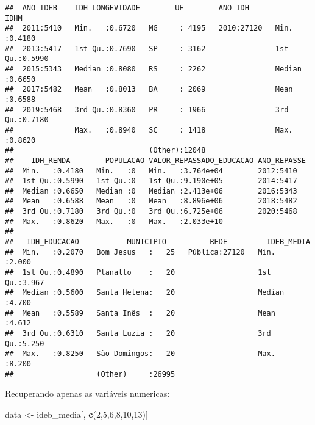 \documentclass[
]{article}
\newenvironment{Shaded}{\begin{snugshade}}{\end{snugshade}}
\newcommand{\DecValTok}[1]{\textcolor[rgb]{0.00,0.00,0.81}{#1}}
\newcommand{\KeywordTok}[1]{\textcolor[rgb]{0.13,0.29,0.53}{\textbf{#1}}}
\newcommand{\NormalTok}[1]{#1}
\newcommand{\OperatorTok}[1]{\textcolor[rgb]{0.81,0.36,0.00}{\textbf{#1}}}
\newcommand{\StringTok}[1]{\textcolor[rgb]{0.31,0.60,0.02}{#1}}
\begin{document}
\begin{verbatim}
##  ANO_IDEB    IDH_LONGEVIDADE        UF        ANO_IDH           IDHM       
##  2011:5410   Min.   :0.6720   MG     : 4195   2010:27120   Min.   :0.4180  
##  2013:5417   1st Qu.:0.7690   SP     : 3162                1st Qu.:0.5990  
##  2015:5343   Median :0.8080   RS     : 2262                Median :0.6650  
##  2017:5482   Mean   :0.8013   BA     : 2069                Mean   :0.6588  
##  2019:5468   3rd Qu.:0.8360   PR     : 1966                3rd Qu.:0.7180  
##              Max.   :0.8940   SC     : 1418                Max.   :0.8620  
##                               (Other):12048                                
##    IDH_RENDA        POPULACAO VALOR_REPASSADO_EDUCACAO ANO_REPASSE
##  Min.   :0.4180   Min.   :0   Min.   :3.764e+04        2012:5410  
##  1st Qu.:0.5990   1st Qu.:0   1st Qu.:9.190e+05        2014:5417  
##  Median :0.6650   Median :0   Median :2.413e+06        2016:5343  
##  Mean   :0.6588   Mean   :0   Mean   :8.896e+06        2018:5482  
##  3rd Qu.:0.7180   3rd Qu.:0   3rd Qu.:6.725e+06        2020:5468  
##  Max.   :0.8620   Max.   :0   Max.   :2.033e+10                   
##                                                                   
##   IDH_EDUCACAO           MUNICIPIO          REDE         IDEB_MEDIA   
##  Min.   :0.2070   Bom Jesus   :   25   Pública:27120   Min.   :2.000  
##  1st Qu.:0.4890   Planalto    :   20                   1st Qu.:3.967  
##  Median :0.5600   Santa Helena:   20                   Median :4.700  
##  Mean   :0.5589   Santa Inês  :   20                   Mean   :4.612  
##  3rd Qu.:0.6310   Santa Luzia :   20                   3rd Qu.:5.250  
##  Max.   :0.8250   São Domingos:   20                   Max.   :8.200  
##                   (Other)     :26995
\end{verbatim}

Recuperando apenas as variáveis numericas:

\begin{Shaded}
\begin{Highlighting}[]
\NormalTok{data \textless{}{-}}\StringTok{ }\NormalTok{ideb\_media[, }\KeywordTok{c}\NormalTok{(}\DecValTok{2}\NormalTok{,}\DecValTok{5}\NormalTok{,}\DecValTok{6}\NormalTok{,}\DecValTok{8}\NormalTok{,}\DecValTok{10}\NormalTok{,}\DecValTok{13}\NormalTok{)]}
\end{Highlighting}
\end{Shaded}

\begin{Shaded}
\end{Shaded}
\end{document}
